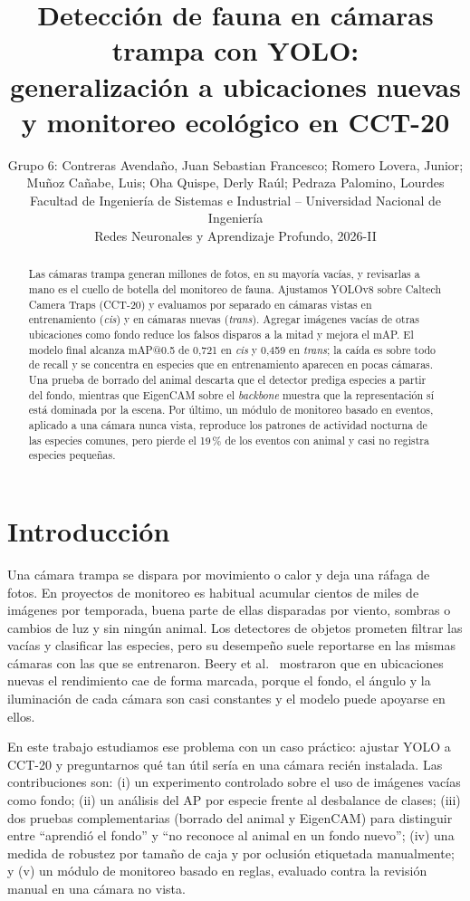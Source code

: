 \documentclass{article}
\title{Detección de fauna en cámaras trampa con YOLO:\\
generalización a ubicaciones nuevas y monitoreo ecológico en CCT-20}
\author{%
  Grupo 6: Contreras Avendaño, Juan Sebastian Francesco; Romero Lovera, Junior;\\
  Muñoz Cañabe, Luis; Oha Quispe, Derly Raúl; Pedraza Palomino, Lourdes\\
  Facultad de Ingeniería de Sistemas e Industrial -- Universidad Nacional de Ingeniería\\
  Redes Neuronales y Aprendizaje Profundo, 2026-II
}
\begin{document}
\maketitle

\begin{abstract}
Las cámaras trampa generan millones de fotos, en su mayoría vacías, y revisarlas
a mano es el cuello de botella del monitoreo de fauna. Ajustamos YOLOv8 sobre
Caltech Camera Traps (CCT-20) y evaluamos por separado en cámaras vistas en
entrenamiento (\emph{cis}) y en cámaras nuevas (\emph{trans}). Agregar imágenes
vacías de otras ubicaciones como fondo reduce los falsos disparos a la mitad y
mejora el mAP. El modelo final alcanza mAP@0.5 de 0,721 en \emph{cis} y 0,459
en \emph{trans}; la caída es sobre todo de recall y se concentra en especies que
en entrenamiento aparecen en pocas cámaras. Una prueba de borrado del animal
descarta que el detector prediga especies a partir del fondo, mientras que
EigenCAM sobre el \emph{backbone} muestra que la representación sí está
dominada por la escena. Por último, un módulo de monitoreo basado en eventos,
aplicado a una cámara nunca vista, reproduce los patrones de actividad
nocturna de las especies comunes, pero pierde el 19\,\% de los eventos con
animal y casi no registra especies pequeñas.
\end{abstract}

\section{Introducción}
\label{sec:intro}

Una cámara trampa se dispara por movimiento o calor y deja una ráfaga de fotos.
En proyectos de monitoreo es habitual acumular cientos de miles de imágenes por
temporada, buena parte de ellas disparadas por viento, sombras o cambios de
luz y sin ningún animal. Los detectores de objetos prometen filtrar
las vacías y clasificar las especies, pero su desempeño suele reportarse en las
mismas cámaras con las que se entrenaron. Beery et al.~\cite{beery2018terra}
mostraron que en ubicaciones nuevas el rendimiento cae de forma marcada, porque
el fondo, el ángulo y la iluminación de cada cámara son casi constantes y el
modelo puede apoyarse en ellos.

En este trabajo estudiamos ese problema con un caso práctico: ajustar YOLO a
CCT-20 y preguntarnos qué tan útil sería en una cámara recién instalada. Las
contribuciones son: (i) un experimento controlado sobre el uso de imágenes
vacías como fondo; (ii) un análisis del AP por especie frente al desbalance de
clases; (iii) dos pruebas complementarias (borrado del animal y EigenCAM) para
distinguir entre ``aprendió el fondo'' y ``no reconoce al animal en un fondo
nuevo''; (iv) una medida de robustez por tamaño de caja y por oclusión
etiquetada manualmente; y (v) un módulo de monitoreo basado en reglas,
evaluado contra la revisión manual en una cámara no vista.
\end{document}
